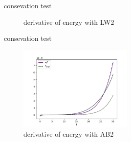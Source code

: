 \documentclass{beamer}
\begin{document}
\begin{frame}{consevation test}
	\begin{figure}[H]
	\centering
	\caption{ derivative of energy with LW2 }
	\end{figure}
\end{frame}


\begin{frame}{consevation test}
	
	\begin{figure}[H]
		\centering
		\includegraphics[width=0.5\textwidth]{./images/cons_ab.png}
		\caption{derivative of energy with AB2}
	\end{figure}
\end{frame}
\end{document}
